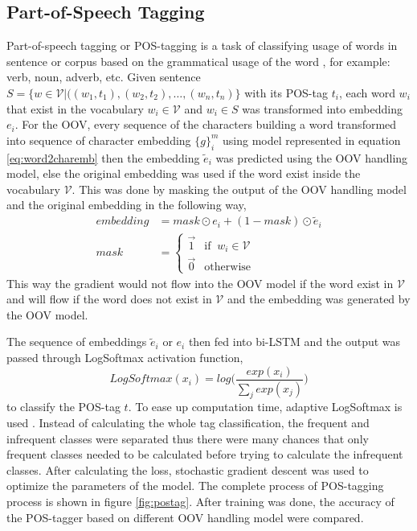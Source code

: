     \subsection{Part-of-Speech Tagging}
        Part-of-speech tagging or POS-tagging is a task of classifying
        usage of words in sentence or corpus based on the grammatical
        usage of the word \citep{robustpostag2018horsmann}, for
        example: verb, noun, adverb, etc. Given sentence $S = \{w \in
        \mathcal{V} \vert ((w_1, t_1), (w_2, t_2), \dots, (w_n,
        t_n)\}$ with its POS-tag $t_i$, each word $w_i$ that exist in
        the vocabulary $w_i \in \mathcal{V}$ and $w_i \in S$ was
        transformed into embedding $e_i$. For the OOV, every sequence
        of the characters building a word transformed into sequence of
        character embedding $\{g\}_{i}^m$ using model represented in
        equation \ref{eq:word2charemb} then the embedding
        $\tilde{e}_i$ was predicted using the OOV handling model, else
        the original embedding was used if the word exist inside the
        vocabulary $\mathcal{V}$. This was done by masking the output
        of the OOV handling model and the original embedding in the
        following way,
        \begin{align}
            \label{eq:embeddingmask}
            embedding &= mask \odot e_i + (1-mask) \odot \tilde{e}_i\\
            mask &=
            \begin{cases}
                \vec{1} & \text{if }\ w_i \in \mathcal{V}\\
                \vec{0} & \text{otherwise}
            \end{cases}
        \end{align}        
        This way the gradient would not flow into the OOV model if the
        word exist in $\mathcal{V}$ and will flow if the word does not
        exist in $\mathcal{V}$ and the embedding was generated by the
        OOV model.

        The sequence of embeddings $\tilde{e}_i$ or $e_i$ then fed
        into bi-LSTM and the output was passed through LogSoftmax
        activation function,
        \begin{equation}
            \label{eq:logsoftmax}
            LogSoftmax(x_i) = log \Bigg(\frac{exp(x_i)}{\sum_j exp(x_j)}\Bigg)
        \end{equation}
        to classify the POS-tag $t$. To ease up computation time,
        adaptive LogSoftmax is used \citep{grave2018efficientsoftmax}.
        Instead of calculating the whole tag classification, the
        frequent and infrequent classes were separated thus there were
        many chances that only frequent classes needed to be calculated
        before trying to calculate the infrequent classes. After
        calculating the loss, stochastic gradient descent was used to
        optimize the parameters of the model. The complete process of
        POS-tagging process is shown in figure \ref{fig:postag}. After
        training was done, the accuracy of the POS-tagger based on
        different OOV handling model were compared.

